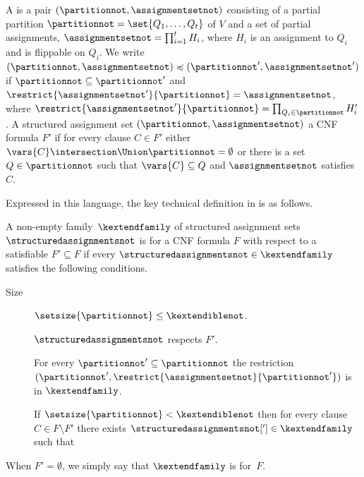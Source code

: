 \documentclass{toc}
\begin{document}
A  is a pair
$(\partitionnot, \assignmentsetnot)$ 
consisting of a partial partition $\partitionnot =
\set{Q_1, \ldots, Q_t}$ of $V$ and a set of 
partial assignments, %
$\assignmentsetnot = \prod_{i = 1}^t H_i$, where
%
%
$H_i$ is an assignment to $Q_i$ and is flippable on $Q_i$.  %
%
%
%
%
We write $(\partitionnot, \assignmentsetnot) \preccurlyeq
(\partitionnot', \assignmentsetnot')$ if $\partitionnot \subseteq \partitionnot'$
and $\restrict{\assignmentsetnot'}{\partitionnot} = \assignmentsetnot$, where
$\restrict{\assignmentsetnot'}{\partitionnot} = \prod_{Q_i \in \partitionnot} H'_i$. 
A structured assignment set $(\partitionnot, \assignmentsetnot)$
 a CNF formula $F'$ if for every clause $C \in
F'$ either $\vars{C}\intersection \Union \partitionnot=\emptyset$ or
there is a set $Q \in \partitionnot$ such that $\vars{C}\subseteq Q$ and
$\assignmentsetnot$ satisfies $C$.

Expressed in this language, the key technical definition in 
\cite{BG15Framework}
is as follows.

\begin{definition}
  \label{def:k-extendible}
  A non-empty family~$\kextendfamily$ of structured assignment sets
  $\structuredassignmentsnot$ is \introduceterm{\kextendible{}} for a CNF
  formula $F$ with respect 
  to a satisfiable $F' \subseteq F$ 
%
%
%
  if every $\structuredassignmentsnot \in \kextendfamily$
  satisfies the following conditions.
  \begin{description}
  \item[Size]%
%
    $\setsize{\partitionnot} \leq \kextendiblenot$.
  \item[\Respectfulness{}]
%
    $\structuredassignmentsnot$ respects $F'$.
  \item[\Restrictionpropname{}] 
%
    For every $\partitionnot' \subseteq \partitionnot$ the restriction
    $(\partitionnot', \restrict{\assignmentsetnot}{\partitionnot'})$ is in
    $\kextendfamily$.
  \item[\Extensionpropname{}]
%
    If $\setsize{\partitionnot} < \kextendiblenot$ then for every
    clause $C \in F\setminus F'$ there exists
    $\structuredassignmentsnot['] \in \kextendfamily$ such that 
  \end{description}
%
  When $F' = \emptyset$, we simply say that $\kextendfamily$
    is \kextendible for~$F$.
%
%
%
%
%
%
%
%
%
%
%
%
%
%
%
%
%
%
%
%
%

\end{definition}
\end{document}
